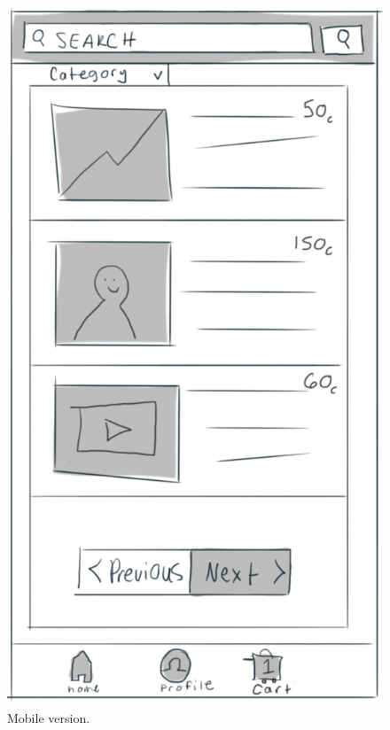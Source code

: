 \documentclass[]{article}
\begin{document}
\begin{enumerate}
		\begin{figure}
		  \includegraphics[width=\linewidth]{./pictures/search_results_mobile.png}
		  \caption{Mobile version.}
		  \label{fig:mobile7}
		\end{figure}
		

\end{enumerate}
\end{document}
